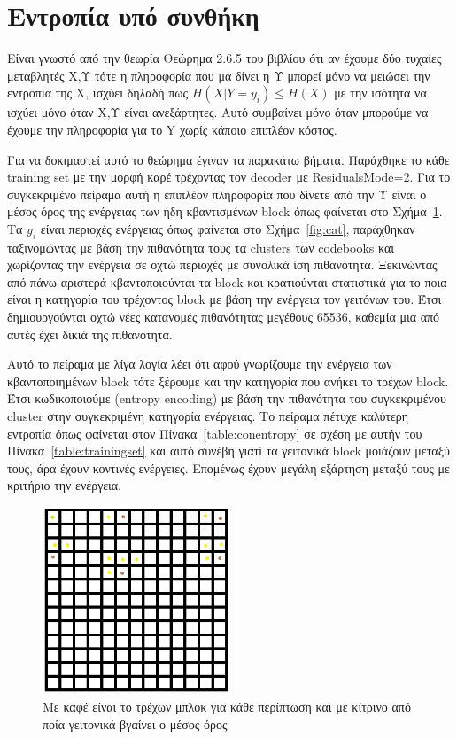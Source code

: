 \section{Εντροπία υπό συνθήκη}
\label{section:sect45}

\indent Είναι γνωστό από την θεωρία Θεώρημα 2.6.5 του βιβλίου \cite{cover} ότι αν έχουμε δύο τυχαίες μεταβλητές Χ,Υ τότε η πληροφορία που μα δίνει η Υ μπορεί μόνο να μειώσει την εντροπία της Χ, ισχύει δηλαδή πως $ H(X|Y=y_i) \leq H(X)$ με την ισότητα να ισχύει μόνο όταν Χ,Υ είναι ανεξάρτητες. Αυτό συμβαίνει μόνο όταν μπορούμε να έχουμε την πληροφορία για το Y χωρίς κάποιο επιπλέον κόστος.

\indent Για να δοκιμαστεί αυτό το θεώρημα έγιναν τα παρακάτω βήματα. Παράχθηκε το κάθε training set με την μορφή καρέ τρέχοντας τον decoder με ResidualsMode=2. Για το συγκεκριμένο πείραμα αυτή η επιπλέον πληροφορία που δίνετε από την Υ είναι ο μέσος όρος της ενέργειας των ήδη κβαντισμένων block όπως φαίνεται στο Σχήμα~\ref{fig:averenergy}. Τα $y_i$ είναι περιοχές ενέργειας όπως φαίνεται στο Σχήμα~\ref{fig:cat}, παράχθηκαν ταξινομώντας με βάση την πιθανότητα τους τα clusters των codebooks και χωρίζοντας την ενέργεια σε οχτώ περιοχές με συνολικά ίση πιθανότητα. Ξεκινώντας από πάνω αριστερά κβαντοποιούνται τα block και κρατιούνται στατιστικά για το ποια είναι η κατηγορία του τρέχοντος block με βάση την ενέργεια τον γειτόνων του. Έτσι δημιουργούνται οχτώ νέες κατανομές πιθανότητας μεγέθους 65536, καθεμία μια από αυτές έχει δικιά της πιθανότητα.

\indent Αυτό το πείραμα με λίγα λογία λέει ότι αφού γνωρίζουμε την ενέργεια των κβαντοποιημένων block τότε ξέρουμε και την κατηγορία που ανήκει το τρέχων block. Έτσι κωδικοποιούμε (entropy encoding) με βάση την πιθανότητα του συγκεκριμένου cluster στην συγκεκριμένη κατηγορία ενέργειας. Το πείραμα πέτυχε καλύτερη εντροπία όπως φαίνεται στον Πίνακα~\ref{table:conentropy} σε σχέση με αυτήν του Πίνακα~\ref{table:trainingset} και αυτό συνέβη γιατί τα γειτονικά block μοιάζουν μεταξύ τους, άρα έχουν κοντινές ενέργειες. Επομένως έχουν μεγάλη εξάρτηση μεταξύ τους με κριτήριο την ενέργεια.

\begin{figure}[ht]
  \centering
  \includegraphics[width=0.5\textwidth]{chapter4/grid.png}
  \caption{Με καφέ είναι το τρέχων μπλοκ για κάθε περίπτωση και με κίτρινο από ποία γειτονικά βγαίνει ο μέσος όρος}
  \label{fig:averenergy}
\end{figure}

